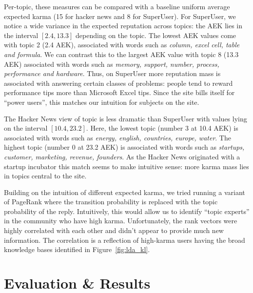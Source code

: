 \documentclass[11pt]{article}
\begin{document}
Per-topic, these measures can be compared with a baseline uniform average
expected karma (15 for hacker news and 8 for SuperUser). For SuperUser, we
notice a wide variance in the expected reputation across topics: the AEK lies in
the interval $[2.4, 13.3]$ depending on the topic. The lowest AEK values come
with topic 2 (2.4 AEK), associated with words such as \textit{column, excel
cell, table and formula}. We can contrast this to the
largest AEK value with topic 8 (13.3 AEK) associated with words such as
\textit{memory, support, number, process, performance and hardware}. Thus, on
SuperUser more reputation mass is associated with answering certain classes of
problems: people tend to reward performance tips more than Microsoft Excel tips.
Since the site bills itself for ``power users'', this matches our intuition for
subjects on the site.

The Hacker News view of topic is less dramatic than SuperUser with values lying
on the interval $[10.4, 23.2]$. Here, the lowest topic (number 3 at 10.4 AEK) is
associated with words such as \textit{energy, english, countries, europe,
water}. The highest topic (number 0 at 23.2 AEK) is associated with words such
as \textit{startups, customer, marketing, revenue, founders}. As the Hacker News
originated with a startup incubator this match seems to make intuitive sense:
more karma mass lies in topics central to the site.

Building on the intuition of different expected karma, we tried running a variant of 
PageRank where the transition probability is replaced with the topic probability of 
the reply. Intuitively, this would allow us to identify ``topic experts'' in the 
community who have high karma. Unfortunately, the rank vectors were highly correlated
with each other and didn't appear to provide much new information. The correlation is 
a reflection of high-karma users having the broad knowledge bases identified in 
Figure~\ref{fig:lda_kl}.


\section{Evaluation \& Results}
\label{sec:eval}
\end{document}
